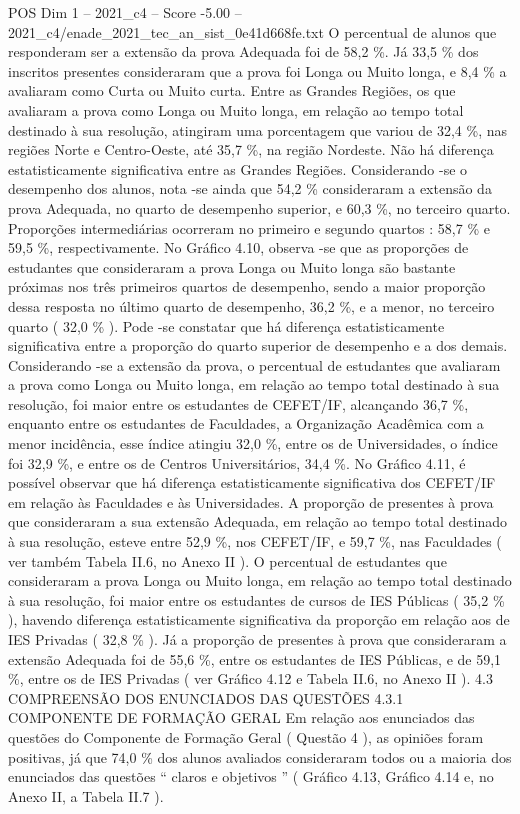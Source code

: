 \begin{textsample}{POS Dim 1 – 2021\_c4 – Score -5.00 – 2021\_c4/enade\_2021\_tec\_an\_sist\_0e41d668fe.txt}
O percentual de alunos que responderam ser a extensão da prova Adequada foi de 58,2 \%.
Já 33,5 \% dos inscritos presentes consideraram que a prova foi Longa ou Muito longa, e 8,4 \% a avaliaram como Curta ou Muito curta.
Entre as Grandes Regiões, os que avaliaram a prova como Longa ou Muito longa, em relação ao tempo total destinado à sua resolução, atingiram uma porcentagem que variou de 32,4 \%, nas regiões Norte e Centro-Oeste, até 35,7 \%, na região Nordeste.
Não há diferença estatisticamente significativa entre as Grandes Regiões.
Considerando -se o desempenho dos alunos, nota -se ainda que 54,2 \% consideraram a extensão da prova Adequada, no quarto de desempenho superior, e 60,3 \%, no terceiro quarto.
Proporções intermediárias ocorreram no primeiro e segundo quartos : 58,7 \% e 59,5 \%, respectivamente.
No Gráfico 4.10, observa -se que as proporções de estudantes que consideraram a prova Longa ou Muito longa são bastante próximas nos três primeiros quartos de desempenho, sendo a maior proporção dessa resposta no último quarto de desempenho, 36,2 \%, e a menor, no terceiro quarto ( 32,0 \% ).
Pode -se constatar que há diferença estatisticamente significativa entre a proporção do quarto superior de desempenho e a dos demais.
Considerando -se a extensão da prova, o percentual de estudantes que avaliaram a prova como Longa ou Muito longa, em relação ao tempo total destinado à sua resolução, foi maior entre os estudantes de CEFET/IF, alcançando 36,7 \%, enquanto entre os estudantes de Faculdades, a Organização Acadêmica com a menor incidência, esse índice atingiu 32,0 \%, entre os de Universidades, o índice foi 32,9 \%, e entre os de Centros Universitários, 34,4 \%.
No Gráfico 4.11, é possível observar que há diferença estatisticamente significativa dos CEFET/IF em relação às Faculdades e às Universidades.
A proporção de presentes à prova que consideraram a sua extensão Adequada, em relação ao tempo total destinado à sua resolução, esteve entre 52,9 \%, nos CEFET/IF, e 59,7 \%, nas Faculdades ( ver também Tabela II.6, no Anexo II ).
O percentual de estudantes que consideraram a prova Longa ou Muito longa, em relação ao tempo total destinado à sua resolução, foi maior entre os estudantes de cursos de IES Públicas ( 35,2 \% ), havendo diferença estatisticamente significativa da proporção em relação aos de IES Privadas ( 32,8 \% ).
Já a proporção de presentes à prova que consideraram a extensão Adequada foi de 55,6 \%, entre os estudantes de IES Públicas, e de 59,1 \%, entre os de IES Privadas ( ver Gráfico 4.12 e Tabela II.6, no Anexo II ). 4.3 COMPREENSÃO DOS ENUNCIADOS DAS QUESTÕES 4.3.1 COMPONENTE DE FORMAÇÃO GERAL Em relação aos enunciados das questões do Componente de Formação Geral ( Questão 4 ), as opiniões foram positivas, já que 74,0 \% dos alunos avaliados consideraram todos ou a maioria dos enunciados das questões “ claros e objetivos ” ( Gráfico 4.13, Gráfico 4.14 e, no Anexo II, a Tabela II.7 ).

\end{textsample}
